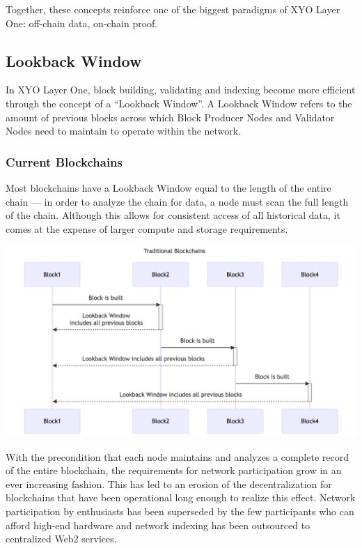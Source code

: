 \documentclass{article}
\begin{document}
Together, these concepts reinforce one of the biggest paradigms of XYO Layer
One: off-chain data, on-chain proof.

\subsection{Lookback Window}
In XYO Layer One, block building, validating and indexing become more efficient
through the concept of a “Lookback Window”. A Lookback Window refers to the
amount of previous blocks across which Block Producer Nodes and Validator Nodes
need to maintain to operate within the network.

\subsubsection{Current Blockchains}
Most blockchains have a Lookback Window equal to the length of the entire chain
— in order to analyze the chain for data, a node must scan the full length of
the chain. Although this allows for consistent access of all historical data,
it comes at the expense of larger compute and storage requirements.

\begin{center}
    \includegraphics[width=15cm]{trad-blockchain-lookback-window.png}
\end{center}

With the precondition that each node maintains and analyzes a complete record
of the entire blockchain, the requirements for network participation grow in an
ever increasing fashion. This has led to an erosion of the decentralization for
blockchains that have been operational long enough to realize this effect.
Network participation by enthusiasts has been superseded by the few
participants who can afford high-end hardware and network indexing has been
outsourced to centralized Web2 services.
\end{document}

